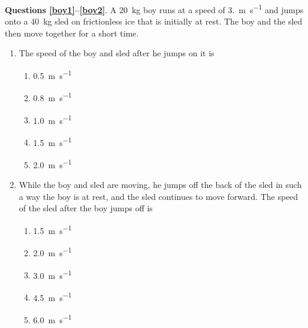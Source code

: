 \documentclass{../../../oss-apphys}
\begin{document}
\begin{multicols}{2}
  \textbf{Questions \ref{boy1}--\ref{boy2}}. A \SI{20}{\kilo\gram} boy runs at
  a speed of \SI{3.}{\metre\per\second} and jumps onto a \SI{40}{\kilo\gram}
  sled on frictionless ice that is initially at rest. The boy and the sled then
  move together for a short time.
  \begin{enumerate}[resume,leftmargin=18pt]
  \item The speed of the boy and sled after he jumps on it is
    \label{boy1}
    \begin{enumerate}[nosep,leftmargin=18pt,label=(\Alph*)]
    \item\SI{0.5}{\metre\per\second}
    \item\SI{0.8}{\metre\per\second}
    \item\SI{1.0}{\metre\per\second}
    \item\SI{1.5}{\metre\per\second}
    \item\SI{2.0}{\metre\per\second}
    \end{enumerate}
    
  \item While the boy and sled are moving, he jumps off the back of the sled in
    such a way the boy is at rest, and the sled continues to move forward.
    The speed of the sled after the boy jumps off is
    \label{boy2}
    \begin{enumerate}[nosep,leftmargin=18pt,label=(\Alph*)]
    \item\SI{1.5}{\metre\per\second}
    \item\SI{2.0}{\metre\per\second}
    \item\SI{3.0}{\metre\per\second}
    \item\SI{4.5}{\metre\per\second}
    \item\SI{6.0}{\metre\per\second}
    \end{enumerate}


\end{enumerate}
\end{multicols}
\end{document}
